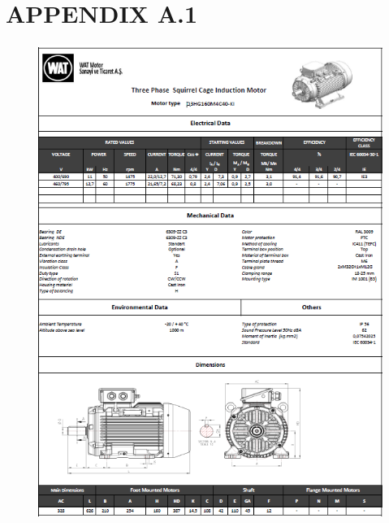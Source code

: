 \chapter{APPENDIX A.1}

\vspace*{16pt}
\begin{figure}[h]
	\centering
	\includegraphics[scale = 0.9,keepaspectratio=true]{./fig/motorparams.PNG}
	\label{motorparams}
\end{figure}




